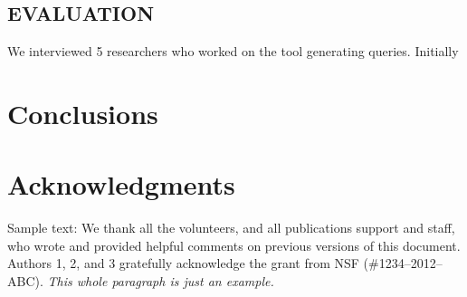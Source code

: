 \documentclass{sigchi}
\begin{document}
\subsection{EVALUATION}
We interviewed 5 researchers who worked on the tool generating queries. Initially

\section{Conclusions}


\section{Acknowledgments}

Sample text: We thank all the volunteers, and all publications support
and staff, who wrote and provided helpful comments on previous
versions of this document. Authors 1, 2, and 3 gratefully acknowledge
the grant from NSF (\#1234--2012--ABC). \textit{This whole paragraph is
  just an example.}




\end{document}
